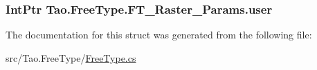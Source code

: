 \label{struct_tao_1_1_free_type_1_1_f_t___raster___params_a1bc733c72fdcfbd3633d713bd23ae9dd}
\hypertarget{struct_tao_1_1_free_type_1_1_f_t___raster___params_acb2db82640119e65c5c409d385ab2084}{
\subsubsection[{user}]{\setlength{\rightskip}{0pt plus 5cm}IntPtr {\bf Tao.FreeType.FT\_\-Raster\_\-Params.user}}}
\label{struct_tao_1_1_free_type_1_1_f_t___raster___params_acb2db82640119e65c5c409d385ab2084}


The documentation for this struct was generated from the following file:\begin{DoxyCompactItemize}
\item 
src/Tao.FreeType/\hyperlink{_free_type_8cs}{FreeType.cs}\end{DoxyCompactItemize}
